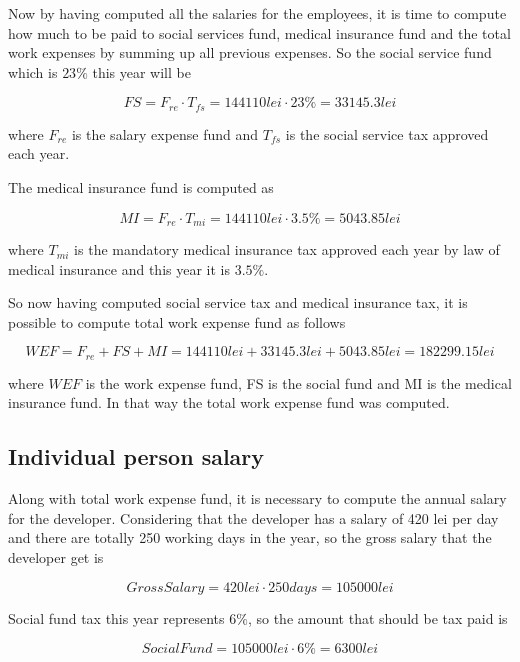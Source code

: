 \documentclass[12pt,a4paper]{report}
\begin{document}
Now by having computed all the salaries for the employees, it is time to compute how much to be paid to social services fund, medical insurance fund and the total work expenses by summing up all previous expenses. So the social service fund which is $23\%$ this year will be 

\begin{equation}
 FS = F_{re} \cdot T_{fs} = 144110 lei \cdot 23 \% = 33145.3 lei 	
\end{equation}

where $F_{re}$ is the salary expense fund and $T_{fs}$ is the social service tax approved each year.

The medical insurance fund is computed as

\begin{equation}
 MI = F_{re} \cdot T_{mi} = 144110 lei \cdot 3.5 \% = 5043.85 lei
\end{equation}

where $T_{mi}$ is the mandatory medical insurance tax approved each year by law of medical insurance and this year it is $3.5\%$. 

So now having computed social service tax and medical insurance tax, it is possible to compute total work expense fund as follows

\begin{equation}
 WEF = F_{re} + FS + MI = 144110 lei + 33145.3 lei + 5043.85 lei = 182299.15 lei
\end{equation}

where $WEF$ is the work expense fund, FS is the social fund and MI is the medical insurance fund. In that way the total work expense fund was computed. 

\subsection{Individual person salary}
Along with total work expense fund, it is necessary to compute the annual salary for the developer. Considering that the developer has a salary of 420 lei per day and there are totally 250 working days in the year, so the gross salary that the developer get is

\begin{equation}
 Gross Salary = 420 lei \cdot 250 days = 105000 lei
\end{equation}

Social fund tax this year represents $6\%$, so the amount that should be tax paid is

\begin{equation}
 Social Fund = 105000 lei \cdot 6\% = 6300 lei
\end{equation}
\end{document}
